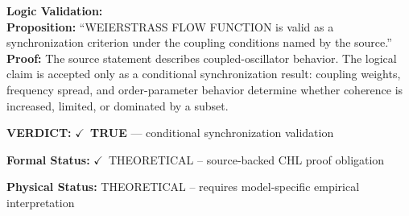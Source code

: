 \textbf{Logic Validation:}\\
\textbf{Proposition:} ``WEIERSTRASS FLOW FUNCTION is valid as a synchronization criterion under the coupling
conditions named by the source.''\\
\textbf{Proof:} The source statement describes coupled-oscillator behavior. The logical claim is
accepted only as a conditional synchronization result: coupling weights, frequency
spread, and order-parameter behavior determine whether coherence is increased, limited,
or dominated by a subset.

\textbf{VERDICT:} \ensuremath{\checkmark}\ \textbf{TRUE} --- conditional synchronization validation

\textbf{Formal Status:} \ensuremath{\checkmark}\ THEORETICAL -- source-backed CHL proof obligation

\textbf{Physical Status:} THEORETICAL -- requires model-specific empirical interpretation
\par\vspace{0.45em}
\par
\ifTZPDarkEdition
{}
\fi
\endgroup
\endgroup
